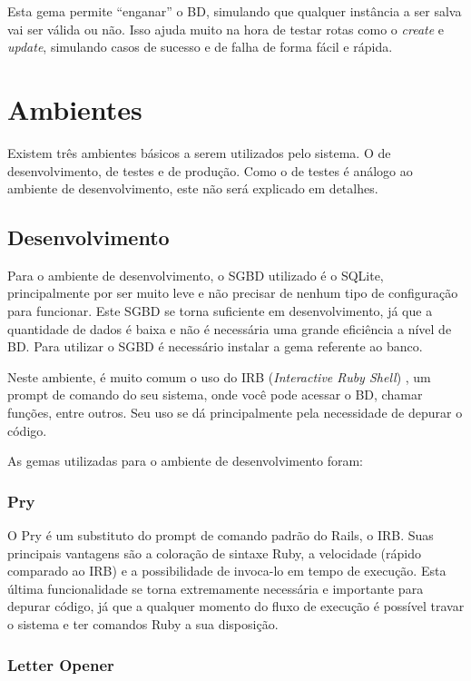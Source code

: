Esta gema permite ``enganar'' o BD, simulando que qualquer instância a ser salva vai ser válida ou não. Isso ajuda muito na hora de testar rotas como o \textit{create} e \textit{update}, simulando casos de sucesso e de falha de forma fácil e rápida.

\section{Ambientes}

Existem três ambientes básicos a serem utilizados pelo sistema. O de desenvolvimento, de testes e de produção. Como o de testes é análogo ao ambiente de desenvolvimento, este não será explicado em detalhes.

\subsection{Desenvolvimento}

Para o ambiente de desenvolvimento, o SGBD utilizado é o SQLite, principalmente por ser muito leve e não precisar de nenhum tipo de configuração para funcionar. Este SGBD se torna suficiente em desenvolvimento, já que a quantidade de dados é baixa e não é necessária uma grande eficiência a nível de BD. Para utilizar o SGBD é necessário instalar a gema referente ao banco.

Neste ambiente, é muito comum o uso do IRB (\textit{Interactive Ruby Shell})
, um prompt de comando do seu sistema, onde você pode acessar o BD, chamar funções, entre outros. Seu uso se dá principalmente pela necessidade de depurar o código.

As gemas utilizadas para o ambiente de desenvolvimento foram:

\subsubsection{Pry~\cite{pry}}

O Pry é um substituto do prompt de comando padrão do Rails, o IRB. Suas principais vantagens são a coloração de sintaxe Ruby, a velocidade (rápido comparado ao IRB) e a possibilidade de invoca-lo em tempo de execução. Esta última funcionalidade se torna extremamente necessária e importante para depurar código, já que a qualquer momento do fluxo de execução é possível travar o sistema e ter comandos Ruby a sua disposição.

\subsubsection{Letter Opener~\cite{letter_opener}}

